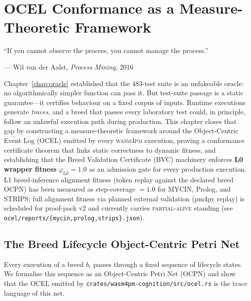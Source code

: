 
\chapter{OCEL Conformance as a Measure-Theoretic Framework}
\label{chap:ocel}
\label{chap:ocel-conformance}

\epigraph{%
  ``If you cannot observe the process, you cannot manage the process.''
}{--- Wil van der Aalst, \textit{Process Mining}, 2016}

Chapter~\ref{chap:oracle} established that the 483-test suite is an
unfakeable oracle: no algorithmically simpler function can pass it.  But
test-suite passage is a static guarantee---it certifies behaviour on a fixed
corpus of inputs.  Runtime executions generate \emph{traces}, and a breed
that passes every laboratory test could, in principle, follow an unlawful
execution path during production.  This chapter closes that gap by
constructing a measure-theoretic framework around the Object-Centric Event
Log (OCEL) \cite{ocel2standard,kusters2025ocpq} emitted by every \textsc{wasm4pm} execution, proving a
conformance certificate theorem that links static correctness to dynamic
fitness, and establishing that the Breed Validation Certificate (BVC)
machinery enforces \textbf{L0 wrapper fitness} $\varphi_{\mathrm{L0}} = 1.0$ as an
admission gate for every production execution. L1 breed-inference alignment fitness
(token replay against the declared breed OCPN) has been measured as step-coverage
$= 1.0$ for MYCIN, Prolog, and STRIPS; full alignment fitness via planned external validation (pm4py replay)
is scheduled for proof-pack v2 and currently carries \textsc{partial-alive} standing
(see \texttt{ocel/reports/\{mycin,prolog,strips\}.json}).

\section{The Breed Lifecycle Object-Centric Petri Net}
\label{sec:breed-ocpn}

Every execution of a breed $b_i$ passes through a fixed sequence of
lifecycle states.  We formalise this sequence as an Object-Centric Petri
Net (OCPN) and show that the OCEL emitted by
\texttt{crates/wasm4pm-cognition/src/ocel.rs} is the trace language of
this net.


